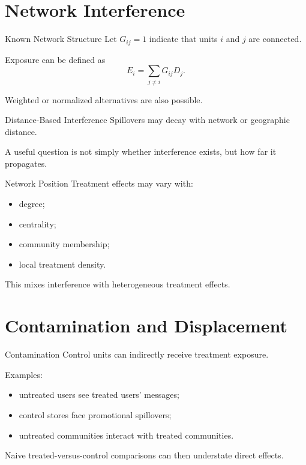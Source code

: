 \documentclass[aspectratio=169,11pt]{beamer}
\begin{document}
\section{Network Interference}

\begin{frame}{Known Network Structure}
Let \(G_{ij}=1\) indicate that units \(i\) and \(j\) are connected.

Exposure can be defined as
\[
E_i
=
\sum_{j\neq i}G_{ij}D_j.
\]

Weighted or normalized alternatives are also possible.
\end{frame}

\begin{frame}{Distance-Based Interference}
Spillovers may decay with network or geographic distance.

A useful question is not simply whether interference exists, but how far it propagates.
\end{frame}

\begin{frame}{Network Position}
Treatment effects may vary with:
\begin{itemize}
\item degree;
\item centrality;
\item community membership;
\item local treatment density.
\end{itemize}

This mixes interference with heterogeneous treatment effects.
\end{frame}

\section{Contamination and Displacement}

\begin{frame}{Contamination}
Control units can indirectly receive treatment exposure.

Examples:
\begin{itemize}
\item untreated users see treated users' messages;
\item control stores face promotional spillovers;
\item untreated communities interact with treated communities.
\end{itemize}

Naive treated-versus-control comparisons can then understate direct effects.
\end{frame}
\end{document}
